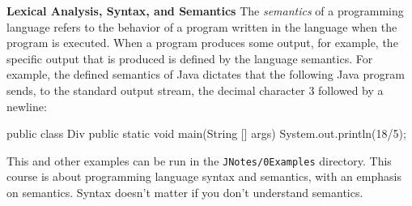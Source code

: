 \begin{minipage}[t]{\sw}
\slidenumber
\LARGE
{\bf Lexical Analysis, Syntax, and Semantics}\exx
The {\em semantics} of a programming language refers
to the behavior of a program written in the language
when the program is executed.
When a program produces some output, for example,
the specific output that is produced is defined
by the language semantics.
For example, the defined semantics of Java dictates
that the following Java program sends,
to the standard output stream, the decimal character 3
followed by a newline:
\Large
\begin{qv}
public class Div {
    public static void main(String [] args) {
        System.out.println(18/5);
    }
}
\end{qv}
\LARGE
This and other examples can be run in the \verb'JNotes/0Examples' directory.\exx
This course is about programming language syntax and semantics,
with an emphasis on semantics.
Syntax doesn't matter if you don't understand semantics.
\end{minipage}
